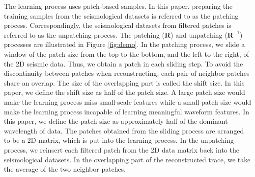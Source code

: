The learning process uses patch-based samples. In this paper, preparing the training samples from the seismological datasets is referred to as the patching process. Correspondingly,  the seismological datasets from filtered patches is referred to as the unpatching process. The patching ($\mathbf{R}$) and unpatching ($\mathbf{R}^{-1}$) processes are illustrated in Figure \ref{fig:demo}. In the patching process, we slide a window of the patch size from the top to the bottom, and the left to the right, of the 2D seismic data. Thus, we obtain a patch in each sliding step. To avoid the discontinuity between patches when reconstructing, each pair of neighbor patches share an overlap. The size of the overlapping part is called the shift size. In this paper, we define the shift size as half of the patch size. A large patch size would make the learning process miss small-scale features while a small patch size would make the learning process incapable of learning meaningful waveform features. In this paper, we define the patch size as approximately half of the dominant wavelength of data. The patches obtained from the sliding process are arranged to be a 2D matrix, which is put into the learning process. In the unpatching process, we reinsert each filtered patch from the 2D data matrix back into the seismological datasets. In the overlapping part of the reconstructed trace, we take the average of the two neighbor patches.  

